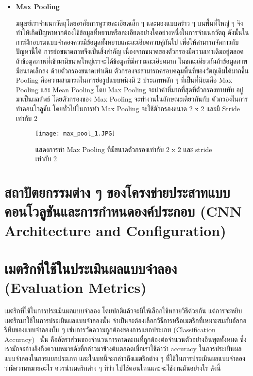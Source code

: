 \begin{itemize}
    \item \textbf{Max Pooling} \par
    มนุษย์เราจำแนกวัตถุโดยอาศัยการดูรายละเอียดเล็ก ๆ และมองแบบคร่าว ๆ บนพื้นที่ใหญ่ ๆ จึงทำให้เกิดปัญหาหากต้องใช้ข้อมูลที่หยาบหรือละเอียดอย่างใดอย่างหนึ่งในการจำแนกวัตถุ
    ดังนั้นในการฝึกอบรมแบบจำลองควรมีข้อมูลทั้งหยาบและละเอียดควบคู่กันไป 
    เพื่อให้สามารถจัดการกับปัญหานี้ได้ การย่อขนาดภาพจึงเป็นสิ่งสำคัญ 
    เนื่องจากขนาดของตัวกรองมีความเท่าเดิมอยู่ตลอด 
    ถ้าข้อมูลภาพที่เข้ามามีขนาดใหญ่เราจะได้ข้อมูลที่มีความละเอียดมาก 
    ในขณะเดียวกันถ้าข้อมูลภาพมีขนาดเล็กลง ด้วยตัวกรองขนาดเท่าเดิม
    ตัวกรองจะสามารถครอบคลุมพื้นที่ของวัตถุเดิมได้มากขึ้น Pooling 
    คือความสามารถในการย่อรูปแบบหนึ่งมี 2 ประเภทหลัก ๆ ที่เป็นที่นิยมคือ Max Pooling 
    และ Mean Pooling โดย Max Pooling 
    จะนำค่าที่มากที่สุดที่ตัวกรองทาบทับ อยู่มาเป็นผลลัพธ์ โดยตัวกรองของ Max Pooling 
    จะทำงานในลักษณะเดียวกันกับ ตัวกรองในการทําคอนโวลูชัน โดยทั่วไปในการทํา Max Pooling 
    จะใช้ตัวกรองขนาด 2 x 2 และมี Stride เท่ากับ 2

    \begin{figure}[h]
        \centering
        \texttt{[image: max\_pool\_1.JPG]}
        \caption{แสดงการทำ Max Pooling ที่มีขนาดตัวกรองเท่ากับ 2 x 2 และ stride เท่ากับ 2}
        \label{Fig:max_pool_1}
    \end{figure}
    
\end{itemize}

\section{สถาปัตยกรรมต่าง ๆ ของโครงข่ายประสาทแบบคอนโวลูชันและการกำหนดองค์ประกอบ (CNN Architecture and Configuration)}


\section{เมตริกที่ใช้ในประเมินผลแบบจำลอง (Evaluation Metrics)}
เมตริกที่ใช้ในการประเมินผลแบบจำลอง โดยปกติแล้วจะมีให้เลือกใช้หลายวิธีด้วยกัน แต่การจะหยิบเมตริกมาใช้ในการประเมินผลแบบจำลองนั้น
จำเป็นจะต้องเลือกวิธีการหรือเมตริกที่เหมาะสมกับอัลกอริทึมของแบบจำลองนั้น ๆ เช่นการวัดความถูกต้องของการแยกประเภท 
(Classification Accuracy)~\cite{international_evalmetric} นั้น คืออัตราส่วนของจำนวนการคาดคะเนที่ถูกต้องต่อจำนวนตัวอย่างอินพุตทั้งหมด 
ซึ่งเรามักจะอ้างอิงถึงความหมายดังที่กล่าวมาข้างต้นตลอดเมื่อเราใช้คำว่า accuracy ในการประเมินผลแบบจำลองในการแยกประเภท
และในบทนี้จะกล่าวถึงเมตริกต่าง ๆ ที่ใช้ในการประเมินผลแบบจำลองว่ามีความหมายอะไร ควรนำเมตริกต่าง ๆ 
ที่ว่า ไปใช้ตอนไหนและจะใช้งานมันอย่างไร ดังนี้


